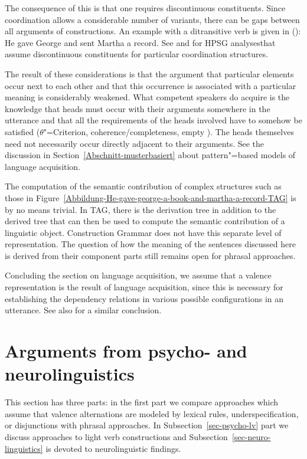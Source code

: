 \begin{exe}
\begin{xlist}[iv.]
\begin{exe}
\begin{xlist}[iv.]
\noindent
The consequence of this is that one requires discontinuous constituents. Since coordination allows a considerable number
of variants, there can be gaps between all arguments of constructions. An example with a ditransitive verb is given in ():
\ea
He gave George and sent Martha a record.
\z
See  and  for HPSG analyses\indexhpsg that assume discontinuous constituents for particular
coordination structures.

The result of these considerations is that the argument that particular elements occur next to each
other and that this occurrence is associated with a particular meaning is considerably
weakened. What competent speakers do acquire is the knowledge that heads must occur with their
arguments somewhere in the utterance and that all the requirements of the heads involved have to
somehow be satisfied ($\theta$"=Criterion, coherence/completeness, empty \subcatl).  The heads
themselves need not necessarily occur directly adjacent to their arguments. See the discussion in
Section~\ref{Abschnitt-musterbasiert} about pattern"=based models of language acquisition.

The computation of the semantic contribution of complex structures such as those in
Figure~\ref{Abbildung-He-gave-george-a-book-and-martha-a-record-TAG} is by no means trivial. In
TAG\indextag, there is the derivation tree in addition to the derived tree that can then be used to
compute the semantic contribution of a linguistic object. Construction Grammar does not have this
separate level of representation. The question of how the meaning of the sentences discussed here is
derived from their component parts still remains open for phrasal approaches.

Concluding the section on language acquisition, we assume that a valence representation is the
result of language acquisition, since this is necessary for establishing the dependency relations in
various possible configurations in an utterance. See also  for a similar conclusion. 

\section{Arguments from psycho- and neurolinguistics}

This section has three parts: in the first part we compare approaches which assume that valence
alternations are modeled by lexical rules, underspecification, or disjunctions with phrasal
approaches. In Subsection~\ref{sec-psycho-lv} part we discuss approaches to light verb constructions and Subsection~\ref{sec-neuro-linguistics}
is devoted to neurolinguistic findings.



\end{xlist}
\end{exe}
\end{xlist}
\end{exe}
